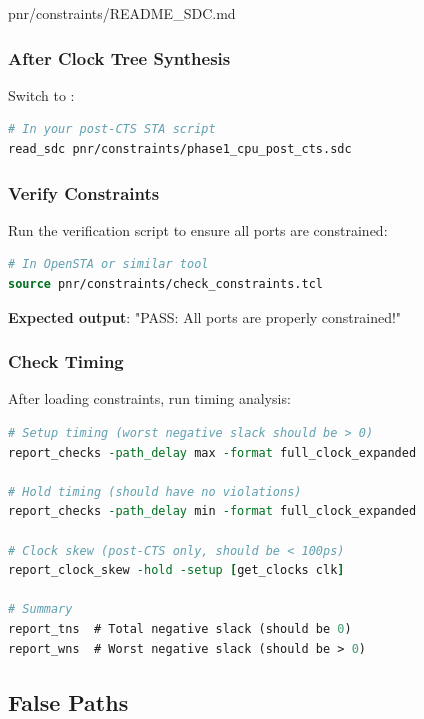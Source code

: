 \begin{relocated}{pnr/constraints/README_SDC.md}
\subsubsection{After Clock Tree Synthesis}\label{tm:pd:constraints-readme-sdc:2-after-clock-tree-synthesis}

Switch to :

\begin{lstlisting}[language=tcl]
# In your post-CTS STA script
read_sdc pnr/constraints/phase1_cpu_post_cts.sdc
\end{lstlisting}

\subsubsection{Verify Constraints}\label{tm:pd:constraints-readme-sdc:3-verify-constraints}

Run the verification script to ensure all ports are constrained:

\begin{lstlisting}[language=tcl]
# In OpenSTA or similar tool
source pnr/constraints/check_constraints.tcl
\end{lstlisting}

\textbf{Expected output}: "PASS: All ports are properly constrained!"

\subsubsection{Check Timing}\label{tm:pd:constraints-readme-sdc:4-check-timing}

After loading constraints, run timing analysis:

\begin{lstlisting}[language=tcl]
# Setup timing (worst negative slack should be > 0)
report_checks -path_delay max -format full_clock_expanded

# Hold timing (should have no violations)
report_checks -path_delay min -format full_clock_expanded

# Clock skew (post-CTS only, should be < 100ps)
report_clock_skew -hold -setup [get_clocks clk]

# Summary
report_tns  # Total negative slack (should be 0)
report_wns  # Worst negative slack (should be > 0)
\end{lstlisting}

\subsection{False Paths}\label{tm:pd:constraints-readme-sdc:false-paths}


\end{relocated}

